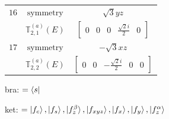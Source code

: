 \documentclass[fleqn,8pt,landscape]{jsarticle}
\begin{document}
\begin{longtable}{ccc}
$ 16 $ & $ \text{symmetry} $ & $ \sqrt{3} y z $ \\
$  $ & $ \mathbb{T}_{2,1}^{(a)}(E) $ & $ \begin{bmatrix} 0 & 0 & 0 & \frac{\sqrt{2} i}{2} & 0 \end{bmatrix} $ \\ \hline
$ 17 $ & $ \text{symmetry} $ & $ - \sqrt{3} x z $ \\
$  $ & $ \mathbb{T}_{2,2}^{(a)}(E) $ & $ \begin{bmatrix} 0 & 0 & - \frac{\sqrt{2} i}{2} & 0 & 0 \end{bmatrix} $ \\ \hline
\end{longtable}
bra: $=\bra{s}$

\noindent
ket: $=\ket{f_{c}}, \ket{f_{s}}, \ket{f_{z}^{\beta}}, \ket{f_{xyz}}, \ket{f_{x}}, \ket{f_{y}}, \ket{f_{z}^{\alpha}}$
\renewcommand{\arraystretch}{1.6}
\end{document}
